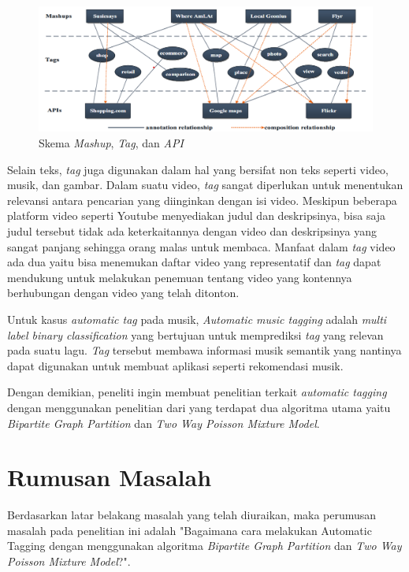 \begin{figure}[H]
    \centering
    \includegraphics[width=1\textwidth]{gambar/mashup tag api.PNG}
    \caption{Skema \textit{Mashup}, \textit{Tag}, dan \textit{API} \citep{shi2016mashuptag}}
    \label{gambar:mashup_tag_api}
\end{figure}

Selain teks, \textit{tag} juga digunakan dalam hal yang bersifat non teks seperti video, musik, dan gambar. Dalam suatu video, \textit{tag} sangat diperlukan untuk menentukan relevansi antara pencarian yang diinginkan dengan isi video. Meskipun beberapa platform video seperti Youtube menyediakan judul dan deskripsinya, bisa saja judul tersebut tidak ada keterkaitannya dengan video dan deskripsinya yang sangat panjang sehingga orang malas untuk membaca. Manfaat dalam \textit{tag} video ada dua yaitu bisa menemukan daftar video yang representatif dan \textit{tag} dapat mendukung untuk melakukan penemuan tentang video yang kontennya berhubungan dengan video yang telah ditonton. \citep{parra2018videotag}

Untuk kasus \textit{automatic tag} pada musik, \textit{Automatic music tagging} adalah \textit{multi label binary classification} yang bertujuan untuk memprediksi \textit{tag} yang relevan pada suatu lagu. \textit{Tag} tersebut membawa informasi musik semantik yang nantinya dapat digunakan untuk membuat aplikasi seperti rekomendasi musik. \citep{won2020musictag}

Dengan demikian, peneliti ingin membuat penelitian terkait \textit{automatic tagging} dengan menggunakan penelitian dari \cite{song2008autotag} yang terdapat dua algoritma utama yaitu \textit{Bipartite Graph Partition} dan \textit{Two Way Poisson Mixture Model}.

\section{Rumusan Masalah}

Berdasarkan  latar belakang masalah yang telah diuraikan, maka perumusan masalah pada penelitian ini adalah "Bagaimana cara melakukan Automatic Tagging dengan menggunakan algoritma \textit{Bipartite Graph Partition} dan \textit{Two Way Poisson Mixture Model}?".

